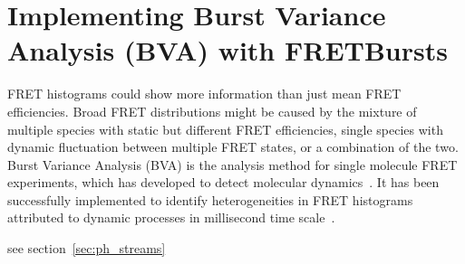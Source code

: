 \section{Implementing Burst Variance Analysis (BVA) with FRETBursts}

FRET histograms could show more information than just mean FRET efficiencies. Broad FRET distributions might be caused by the mixture of multiple species with static but different FRET efficiencies, single species with dynamic fluctuation between multiple FRET states, or a combination of the two. Burst Variance Analysis (BVA) is the analysis method for single molecule FRET experiments, which has developed to detect molecular dynamics~\cite{Torella_2011}. It has been successfully implemented to identify heterogeneities in FRET histograms attributed to dynamic processes in millisecond time scale~\cite{Torella_2011, Robb_2013}.

see section~\ref{sec:ph_streams}